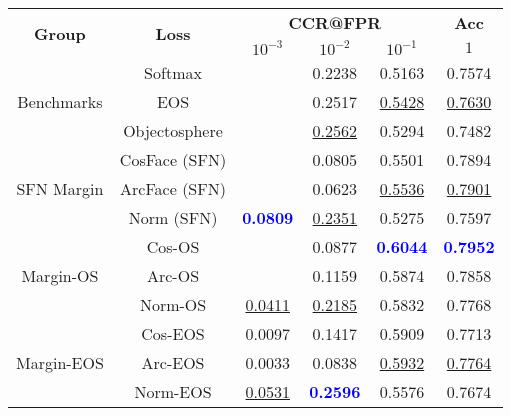 \begin{tabularx}{.7\textwidth}{|c|c||ccc|c|}
\hline
\multirow{2}{*}{\bf Group} & \multirow{2}{*}{\bf Loss} & \multicolumn{3}{c|}{\bf CCR@FPR} & \bf {Acc} \\ \cline{3-6}
& &$10^{-3}$ & $10^{-2}$ & $10^{-1}$ & $1$\\\hline\hline
\multirow{3}{*}{Benchmarks} & Softmax & & 0.2238 & 0.5163 & 0.7574\\
 & EOS & & 0.2517 & \underline {0.5428} & \underline {0.7630}\\
 & Objectosphere & & \underline {0.2562} & 0.5294 & 0.7482\\
\hline
\multirow{3}{*}{SFN Margin} & CosFace (SFN) & & 0.0805 & 0.5501 & 0.7894\\
 & ArcFace (SFN) & & 0.0623 & \underline {0.5536} & \underline {0.7901}\\
 & Norm (SFN) & \textcolor{blue}{\bf 0.0809} & \underline {0.2351} & 0.5275 & 0.7597\\
\hline
\multirow{3}{*}{Margin-OS} & Cos-OS & & 0.0877 & \textcolor{blue}{\bf 0.6044} & \textcolor{blue}{\bf 0.7952}\\
 & Arc-OS & & 0.1159 & 0.5874 & 0.7858\\
 & Norm-OS & \underline {0.0411} & \underline {0.2185} & 0.5832 & 0.7768\\
\hline
\multirow{3}{*}{Margin-EOS} & Cos-EOS & 0.0097 & 0.1417 & 0.5909 & 0.7713\\
 & Arc-EOS & 0.0033 & 0.0838 & \underline {0.5932} & \underline {0.7764}\\
 & Norm-EOS & \underline {0.0531} & \textcolor{blue}{\bf 0.2596} & 0.5576 & 0.7674\\
\hline
\end{tabularx}

